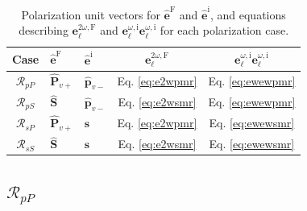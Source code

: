 \begin{table}[b]
\centering
\begin{tabular}{ | c l l c c | }
\hline
Case               & $\hat{\mathbf{e}}^{\mathrm{F}}$
                   & $\hat{\mathbf{e}}^{\mathrm{i}}$
                   & $\mathbf{e}^{2\omega,\mathrm{F}}_{\ell}$
                   & $\mathbf{e}^{\omega,\mathrm{i}}_{\ell}
                      \mathbf{e}^{\omega,\mathrm{i}}_{\ell}$ \\
\hline
$\mathcal{R}_{pP}$ & $\hat{\mathbf{P}}_{v+}$
                   & $\hat{\mathbf{p}}_{v-}$
                   &  Eq. \eqref{eq:e2wpmr} & Eq. \eqref{eq:ewewpmr} \\
$\mathcal{R}_{pS}$ & $\hat{\mathbf{S}}$
                   & $\hat{\mathbf{p}}_{v-}$
                   &  Eq. \eqref{eq:e2wsmr} & Eq. \eqref{eq:ewewpmr} \\
$\mathcal{R}_{sP}$ & $\hat{\mathbf{P}}_{v+}$
                   & $\hat{\mathbf{s}}$
                   &  Eq. \eqref{eq:e2wpmr} & Eq. \eqref{eq:ewewsmr} \\
$\mathcal{R}_{sS}$ & $\hat{\mathbf{S}}$
                   & $\hat{\mathbf{s}}$
                   &  Eq. \eqref{eq:e2wsmr} & Eq. \eqref{eq:ewewsmr} \\
\hline
\end{tabular}
\caption{Polarization unit vectors for $\hat{\mathbf{e}}^{\mathrm{F}}$ and $\hat{\mathbf{e}}^{\mathrm{i}}$, and equations describing $\mathbf{e}^{2\omega,\mathrm{F}}_{\ell}$ and $\mathbf{e}^{\omega,\mathrm{i}}_{\ell}\mathbf{e}^{\omega,\mathrm{i}}_{\ell}$ for each polarization case.}
\label{tab:summary}
\end{table}



\subsection{\texorpdfstring{$\mathcal{R}_{pP}$}{RpP}}\label{sec:RpP} 

